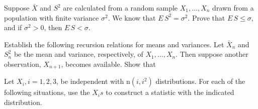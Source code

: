 \documentclass[12pt,letterpaper]{exam}
\begin{document}
\begin{questions}
	\begin{solution}
		
	\end{solution}
	
	\setcounter{question}{10}
	\question 
	Suppose \(\bar{X}\) and \(S^2\) are calculated from a random sample \(X_1,\ldots, X_n\) 
	drawn from a population with finite variance \(\sigma^2\). We know that \(E\,S^2 = \sigma^2\). 
	Prove that \(E\,S \leq \sigma\), and
	if \(\sigma^2 > 0\), then \(E\,S < \sigma\).
	
	\begin{solution}
		
	\end{solution}
	
	\setcounter{question}{14}
	\question 
	Establish the following recursion relations for means and variances. 
	Let \(\bar{X}_n\) and \(S_n^2\) be the mean and variance, respectively, of \(X_1,\ldots,X_n\). 
	Then suppose another observation, \(X_{n+1}\), becomes available. Show that
	
	
	\begin{solution}
		
	\end{solution}
	
	\question 
	Let \(X_i,i = 1, 2, 3\), be independent with n\((i,i^2)\) distributions. 
	For each of the following situations, use the \(X_is\) to construct a statistic with the indicated distribution.
	
\end{questions}
\end{document}

